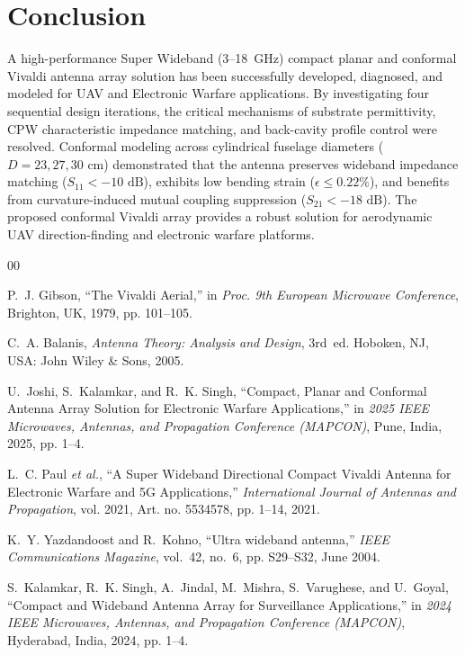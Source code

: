 \documentclass[journal,compsoc,twocolumn,10pt]{IEEEtran}
\begin{document}
\section{Conclusion}
A high-performance Super Wideband (3--18~GHz) compact planar and conformal Vivaldi antenna array solution has been successfully developed, diagnosed, and modeled for UAV and Electronic Warfare applications. By investigating four sequential design iterations, the critical mechanisms of substrate permittivity, CPW characteristic impedance matching, and back-cavity profile control were resolved. Conformal modeling across cylindrical fuselage diameters ($D = 23, 27, 30\text{ cm}$) demonstrated that the antenna preserves wideband impedance matching ($S_{11} < -10\text{ dB}$), exhibits low bending strain ($\epsilon \le 0.22\%$), and benefits from curvature-induced mutual coupling suppression ($S_{21} < -18\text{ dB}$). The proposed conformal Vivaldi array provides a robust solution for aerodynamic UAV direction-finding and electronic warfare platforms.

\begin{thebibliography}{00}

P.~J. Gibson, ``The Vivaldi Aerial,'' in \emph{Proc. 9th European Microwave Conference}, Brighton, UK, 1979, pp. 101--105.

C.~A. Balanis, \emph{Antenna Theory: Analysis and Design}, 3rd~ed. Hoboken, NJ, USA: John Wiley \& Sons, 2005.

U.~Joshi, S.~Kalamkar, and R.~K. Singh, ``Compact, Planar and Conformal Antenna Array Solution for Electronic Warfare Applications,'' in \emph{2025 IEEE Microwaves, Antennas, and Propagation Conference (MAPCON)}, Pune, India, 2025, pp. 1--4.

L.~C. Paul \emph{et al.}, ``A Super Wideband Directional Compact Vivaldi Antenna for Electronic Warfare and 5G Applications,'' \emph{International Journal of Antennas and Propagation}, vol. 2021, Art. no. 5534578, pp. 1--14, 2021.

K.~Y. Yazdandoost and R.~Kohno, ``Ultra wideband antenna,'' \emph{IEEE Communications Magazine}, vol.~42, no.~6, pp. S29--S32, June 2004.

S.~Kalamkar, R.~K. Singh, A.~Jindal, M.~Mishra, S.~Varughese, and U.~Goyal, ``Compact and Wideband Antenna Array for Surveillance Applications,'' in \emph{2024 IEEE Microwaves, Antennas, and Propagation Conference (MAPCON)}, Hyderabad, India, 2024, pp. 1--4.

\end{thebibliography}
\end{document}
